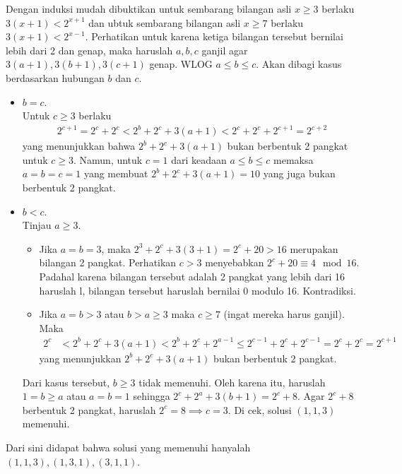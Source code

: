 
\begin{solusi}
    Dengan induksi mudah dibuktikan untuk sembarang bilangan asli $x \ge 3$  berlaku $3(x+1) < 2^{x+1}$ dan ubtuk sembarang bilangan asli $x \ge 7$ berlaku $3(x+1) < 2^{x-1}$. Perhatikan untuk karena ketiga bilangan tersebut bernilai lebih dari 2 dan genap, maka haruslah $a,b,c$ ganjil agar $3(a+1),3(b+1),3(c+1)$ genap.
    WLOG $a \le b \le c$. Akan dibagi kasus berdasarkan hubungan $b$ dan $c$.

    \begin{itemize}
        \item $b = c$.\\
        Untuk $c \ge 3$ berlaku
        \begin{align*}
            2^{c+1} = 2^c + 2^c < 2^b + 2^c + 3(a+1) < 2^c + 2^c +2^{c+1} = 2^{c+2}
        \end{align*}
        yang menunjukkan bahwa $2^b + 2^c + 3(a+1)$ bukan berbentuk 2 pangkat untuk $c \ge 3$. Namun, untuk $c=1$ dari keadaan $a \le b \le c$ memaksa $a=b=c=1$ yang membuat $2^b+2^c+3(a+1)=10$ yang juga bukan berbentuk 2 pangkat.

        \item $b < c$.\\
        Tinjau $a \ge 3$.
        \begin{itemize}
        \item Jika $a=b=3$, maka $2^3+2^c+3(3+1)=2^c+20>16$ merupakan bilangan 2 pangkat. Perhatikan $c>3$ menyebabkan $2^c+20 \equiv 4 \mod 16$. Padahal karena bilangan tersebut adalah 2 pangkat yang lebih dari 16 haruslah l, bilangan tersebut haruslah bernilai 0 modulo 16. Kontradiksi.

        \item Jika $a=b > 3$ atau $b > a \ge 3$ maka $c \ge 7$ (ingat mereka harus ganjil). Maka
        \begin{align*}
            2^{c} &< 2^b + 2^c + 3(a+1)
            < 2^b + 2^c + 2^{a-1} \le 2^{c-1} + 2^c + 2^{c-1} = 2^c + 2^{c} = 2^{c+1}
        \end{align*}
        yang menunjukkan $2^b + 2^c + 3(a+1)$ bukan berbentuk 2 pangkat.
        \end{itemize}
      
        Dari kasus tersebut, $b \ge 3$ tidak memenuhi. Oleh karena itu, haruslah $1 = b \ge a$ atau $a=b=1$ sehingga $2^c+2^a+3(b+1)=2^c+8$. Agar $2^c+8$ berbentuk 2 pangkat, haruslah $2^c=8 \implies c=3$. Di cek, solusi $(1,1,3)$ memenuhi.
    \end{itemize}
    Dari sini didapat bahwa solusi yang memenuhi hanyalah $(1,1,3), (1,3,1), (3,1,1)$.
\end{solusi}